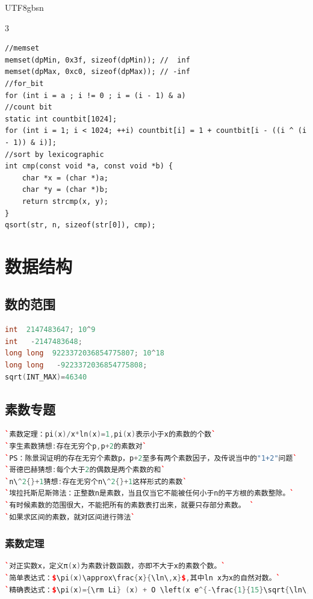 \documentclass[a4paper]{article}
\begin{document}
\begin{CJK*}{UTF8}{gbsn}
\begin{multicols}{3}
\begin{flushleft}
\begin{lstlisting}
//memset
memset(dpMin, 0x3f, sizeof(dpMin)); //  inf
memset(dpMax, 0xc0, sizeof(dpMax)); // -inf
//for_bit
for (int i = a ; i != 0 ; i = (i - 1) & a)
//count bit
static int countbit[1024];
for (int i = 1; i < 1024; ++i) countbit[i] = 1 + countbit[i - ((i ^ (i - 1)) & i)];
//sort by lexicographic
int cmp(const void *a, const void *b) {
	char *x = (char *)a;
	char *y = (char *)b;
	return strcmp(x, y);
}
qsort(str, n, sizeof(str[0]), cmp);
\end{lstlisting}


\section{数据结构}

\subsection{数的范围}
\begin{lstlisting}[language={c++}]
int  2147483647; 10^9
int   -2147483648;
long long  9223372036854775807; 10^18
long long   -9223372036854775808;
sqrt(INT_MAX)=46340
\end{lstlisting}

\subsection{素数专题}
\begin{lstlisting}[language={c++}]
`素数定理：pi(x)/x*ln(x)=1,pi(x)表示小于x的素数的个数`
`孪生素数猜想:存在无穷个p,p+2的素数对`
`PS：陈景润证明的存在无穷个素数p，p+2至多有两个素数因子，及传说当中的"1+2"问题`
`哥德巴赫猜想:每个大于2的偶数是两个素数的和`
`n\^2{}+1猜想:存在无穷个n\^2{}+1这样形式的素数`
`埃拉托斯尼斯筛法：正整数n是素数，当且仅当它不能被任何小于n的平方根的素数整除。`
`有时候素数的范围很大，不能把所有的素数表打出来，就要只存部分素数。 `
`如果求区间的素数，就对区间进行筛法`
\end{lstlisting}



\subsubsection{素数定理}
\begin{lstlisting}[language={c++}]
`对正实数x，定义π(x)为素数计数函数，亦即不大于x的素数个数。`
`简单表达式：$\pi(x)\approx\frac{x}{\ln\,x}$,其中ln x为x的自然对数。`
`精确表达式：$\pi(x)={\rm Li} (x) + O \left(x e^{-\frac{1}{15}\sqrt{\ln\,x}}\right)$,其中 ${\rm Li} (x) = \int_2^x \frac{dt}{\ln\,t}$`
\end{lstlisting}


\end{flushleft}
\end{multicols}
\end{CJK*}
\end{document}
